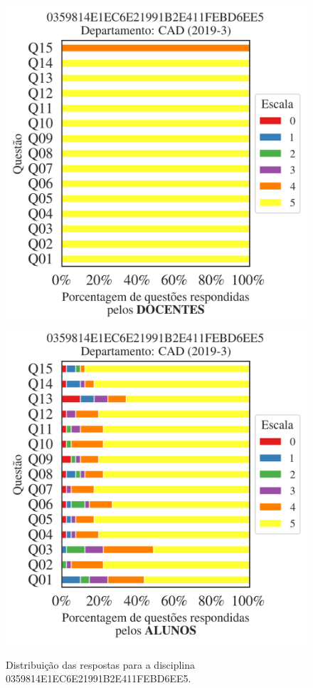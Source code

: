 \documentclass[a4paper,10pt]{article}
\begin{document}
\begin{figure}[h]
\centering
\includegraphics[width=0.485\linewidth]{analise_disciplina_departamento_CAD_0359814E1EC6E21991B2E411FEBD6EE5_docentes.png}
\includegraphics[width=0.485\linewidth]{analise_disciplina_departamento_CAD_0359814E1EC6E21991B2E411FEBD6EE5_alunos.png}
\caption{\label{fig:analise_geral_departamento}                Distribuição das respostas para a disciplina 0359814E1EC6E21991B2E411FEBD6EE5. }
\end{figure}
\end{document}
